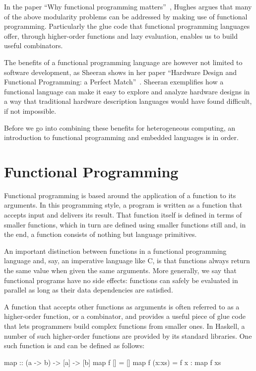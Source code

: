 \documentclass[../paper.tex]{subfiles}
\begin{document}
In the paper ``Why functional programming matters''~\cite{hughes1989}, Hughes argues that many of the above modularity problems can be addressed by making use of functional programming. Particularly the glue code that functional programming languages offer, through higher-order functions and lazy evaluation, enables us to build useful combinators.

The benefits of a functional programming language are however not limited to software development, as Sheeran shows in her paper ``Hardware Design and Functional Programming: a Perfect Match''~\cite{sheeran2005}. Sheeran exemplifies how a functional language can make it easy to explore and analyze hardware designs in a way that traditional hardware description languages would have found difficult, if not impossible.

Before we go into combining these benefits for heterogeneous computing, an introduction to functional programming and embedded languages is in order.

\section{Functional Programming}
\label{functional}

Functional programming is based around the application of a function to its arguments. In this programming style, a program is written as a function that accepts input and delivers its result. That function itself is defined in terms of smaller functions, which in turn are defined using smaller functions still and, in the end, a function consists of nothing but language primitives.

An important distinction between functions in a functional programming language and, say, an imperative language like C, is that functions always return the same value when given the same arguments. More generally, we say that functional programs have no side effects: functions can safely be evaluated in parallel as long as their data dependencies are satisfied.

A function that accepts other functions as arguments is often referred to as a higher-order function, or a combinator, and provides a useful piece of glue code that lets programmers build complex functions from smaller ones. In Haskell, a number of such higher-order functions are provided by its standard libraries. One such function is  and can be defined as follows:

\begin{code}
map :: (a -> b) -> [a] -> [b]
map f []     = []
map f (x:xs) = f x : map f xs
\end{code}
\end{document}
